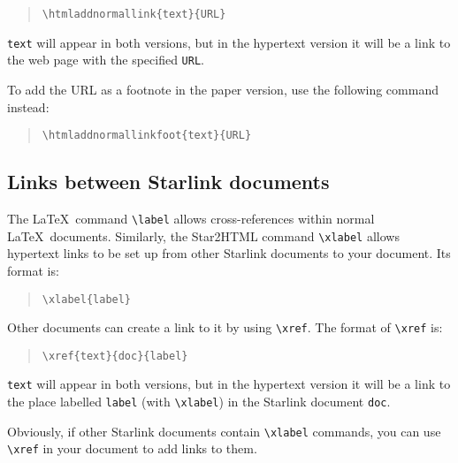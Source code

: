 \documentclass[twoside,11pt]{article}
\newcommand{\htmladdnormallinkfoot}[2]{#1\footnote{#2}}
\newcommand{\htmladdnormallink}[2]{#1}
\newcommand{\xref}[3]{#1}
\newcommand{\xlabel}[1]{}
\renewcommand{\_}{\texttt{\symbol{95}}}
\begin{document}
\begin{quote}
\begin{verbatim}
\htmladdnormallink{text}{URL}
\end{verbatim}
\end{quote}

\texttt{text} will appear in both versions, but in the hypertext version it
will be a link to the web page with the specified
\htmladdnormallink{\texttt{URL}}
{http://www.w3.org/hypertext/WWW/Addressing/Addressing.html}.

To add the URL as a footnote in the paper version, use the following command
instead:

\begin{quote}
\begin{verbatim}
\htmladdnormallinkfoot{text}{URL}
\end{verbatim}
\end{quote}

\subsection{\xlabel{links_between_starlink_documents}Links between Starlink documents}

The \LaTeX\ command \verb#\label# allows cross-references within normal
\LaTeX\ documents.
Similarly, the Star2HTML command \verb#\xlabel# allows hypertext links to be
set up from other Starlink documents to your document.
Its format is:

\begin{quote}
\begin{verbatim}
\xlabel{label}
\end{verbatim}
\end{quote}

Other documents can create a link to it by using \verb+\xref+.
The format of \verb+\xref+ is:

\begin{quote}
\begin{verbatim}
\xref{text}{doc}{label}
\end{verbatim}
\end{quote}

\texttt{text} will appear in both versions, but in the hypertext version it
will be a link to the place labelled \texttt{label} (with \verb+\xlabel+) in
the Starlink document \texttt{doc}.

Obviously, if other Starlink documents contain \verb+\xlabel+ commands, you
can use \verb+\xref+ in your document to add links to them.
\end{document}
